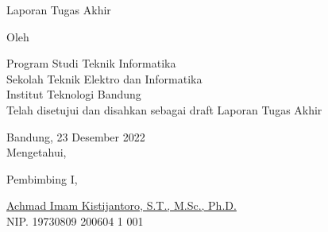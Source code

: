 \clearpage
\pagestyle{empty}

\begin{center}
    \smallskip

    \Large \bfseries \MakeUppercase{\thetitle}
    \vfill

    \Large Laporan Tugas Akhir
    \vfill

    \large Oleh

    \Large \theauthor

    \large Program Studi Teknik Informatika \\

    \normalsize \normalfont
    Sekolah Teknik Elektro dan Informatika \\
    Institut Teknologi Bandung \\

    \vfill
    \normalsize \normalfont
    Telah disetujui dan disahkan sebagai draft Laporan Tugas Akhir

    \vfill
    \normalsize \normalfont
    Bandung, 23 Desember 2022 \\
    Mengetahui,

    \vspace{0.5cm}
    Pembimbing I,

    \vfill
    \underline{Achmad Imam Kistijantoro, S.T., M.Sc., Ph.D.} \\
    NIP. 19730809 200604 1 001

\end{center}
\clearpage

